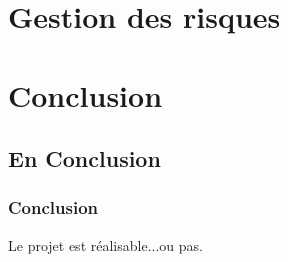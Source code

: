 \documentclass{beamer}
\begin{document}
\section{Gestion des risques}


\section{Conclusion}

\subsection{En Conclusion}

\begin{frame}
\frametitle{Conclusion}
Le projet est réalisable...ou pas.
\end{frame}



\end{document}
